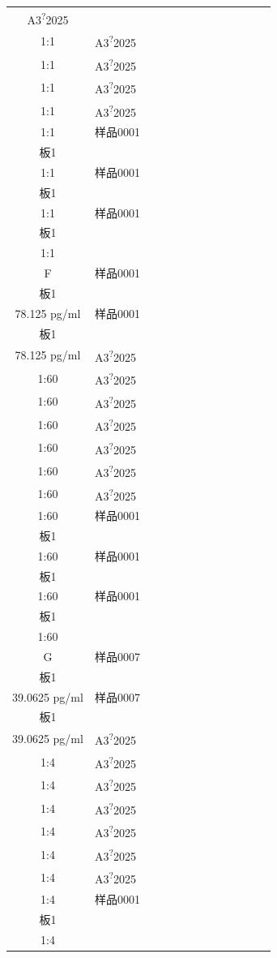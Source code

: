 \documentclass[UTF8,10pt,a4paper,fontset=fandol]{ctexart}
\begin{document}
\begin{center}
\begin{tabular}{|c|*{12}{p{0.62cm}|}}
A3\textsuperscript{?}2025\\1:1 &
A3\textsuperscript{?}2025\\1:1 &
A3\textsuperscript{?}2025\\1:1 &
A3\textsuperscript{?}2025\\1:1 &
A3\textsuperscript{?}2025\\1:1 &
样品0001\\板1\\1:1 &
样品0001\\板1\\1:1 &
样品0001\\板1\\1:1
\\ \hline
F &
样品0001\\板1\\78.125 pg/ml &
样品0001\\板1\\78.125 pg/ml &
A3\textsuperscript{?}2025\\1:60 &
A3\textsuperscript{?}2025\\1:60 &
A3\textsuperscript{?}2025\\1:60 &
A3\textsuperscript{?}2025\\1:60 &
A3\textsuperscript{?}2025\\1:60 &
A3\textsuperscript{?}2025\\1:60 &
A3\textsuperscript{?}2025\\1:60 &
样品0001\\板1\\1:60 &
样品0001\\板1\\1:60 &
样品0001\\板1\\1:60
\\ \hline
G &
样品0007\\板1\\39.0625 pg/ml &
样品0007\\板1\\39.0625 pg/ml &
A3\textsuperscript{?}2025\\1:4 &
A3\textsuperscript{?}2025\\1:4 &
A3\textsuperscript{?}2025\\1:4 &
A3\textsuperscript{?}2025\\1:4 &
A3\textsuperscript{?}2025\\1:4 &
A3\textsuperscript{?}2025\\1:4 &
A3\textsuperscript{?}2025\\1:4 &
样品0001\\板1\\1:4 &

\end{tabular}
\end{center}
\end{document}
